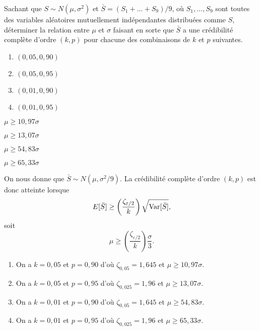 \begin{exercice}
  Sachant que $S \sim N(\mu, \sigma^2)$ et $\bar{S} = (S_1 + \dots +
  S_9)/9$, où $S_1, \dots, S_9$ sont toutes des variables aléatoires
  mutuellement indépendantes distribuées comme $S$, déterminer la
  relation entre $\mu$ et $\sigma$ faisant en sorte que $\bar{S}$ a
  une crédibilité complète d'ordre $(k, p)$ pour chacune des
  combinaisons de $k$ et $p$ suivantes.
  \begin{enumerate}
  \item $(0,05, 0,90)$
  \item $(0,05, 0,95)$
  \item $(0,01, 0,90)$
  \item $(0,01, 0,95)$
  \end{enumerate}
  \begin{rep}
    \begin{inparaenum}
    \item $\mu \geq 10,97 \sigma$
    \item $\mu \geq 13,07 \sigma$
    \item $\mu \geq 54,83 \sigma$
    \item $\mu \geq 65,33 \sigma$
    \end{inparaenum}
  \end{rep}
  \begin{sol}
    On nous donne que $\bar{S} \sim N(\mu, \sigma^2/9)$. La
    crédibilité complète d'ordre $(k, p)$ est donc atteinte lorsque
    \begin{equation*}
      E [ \bar{S} ] \geq \left( \frac{\zeta_{\varepsilon/2}}{k} \right)
      \sqrt{\operatorname{Var} [ \bar{S} ]},
    \end{equation*}
    soit
    \begin{equation*}
      \mu \geq \left( \frac{\zeta_{\varepsilon/2}}{k} \right)
      \frac{\sigma}{3}.
    \end{equation*}
    \begin{enumerate}
    \item On a $k = 0,05$ et $p = 0,90$ d'où $\zeta_{0,05} = 1,645$ et
      $\mu \geq 10,97 \sigma$.
    \item On a $k = 0,05$ et $p = 0,95$ d'où $\zeta_{0,025} = 1,96$ et
      $\mu \geq 13,07 \sigma$.
    \item On a $k = 0,01$ et $p = 0,90$ d'où $\zeta_{0,05} = 1,645$ et
      $\mu \geq 54,83 \sigma$.
    \item On a $k = 0,01$ et $p = 0,95$ d'où $\zeta_{0,025} = 1,96$ et
      $\mu \geq 65,33 \sigma$.
    \end{enumerate}
  \end{sol}
\end{exercice}


